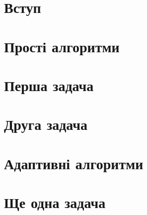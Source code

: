 \documentclass[a4paper,14pt,openany,oneside,oldfontcommands]{memoir}
\begin{document}
 
\newpage
\tableofcontents
\newpage

\setcounter{page}{3}

\chapter{Вступ}

\newpage

\chapter{Прості алгоритми}

\newpage

\newpage

\chapter{Перша задача}

\newpage

\newpage

\chapter{Друга задача}

\newpage

\newpage

\chapter{Адаптивні алгоритми}

\newpage

\newpage

\newpage

\chapter{Ще одна задача}

\newpage

\newpage
\end{document}
